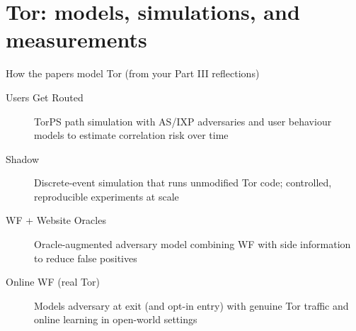 
\section{Tor: models, simulations, and measurements}

\begin{frame}
  \begin{block}{How the papers model Tor (from your Part III reflections)}
    \begin{description}
      \item[Users Get Routed] TorPS path simulation with AS/IXP adversaries and user behaviour models to estimate correlation risk over time
      \item[Shadow] Discrete-event simulation that runs unmodified Tor code; controlled, reproducible experiments at scale
      \item[WF + Website Oracles] Oracle-augmented adversary model combining WF with side information to reduce false positives
      \item[Online WF (real Tor)] Models adversary at exit (and opt-in entry) with genuine Tor traffic and online learning in open-world settings
    \end{description}
  \end{block}
\end{frame}

